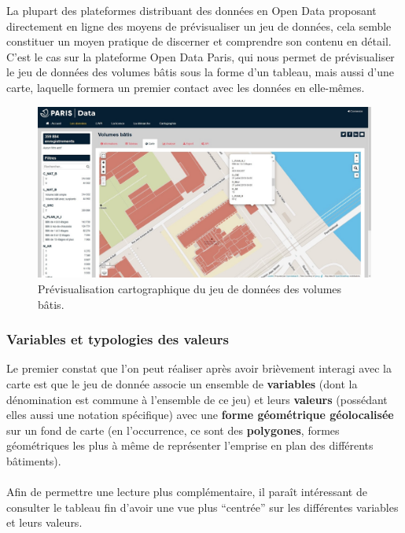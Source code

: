 \documentclass[
  11pt,
  french,
]{article}
\begin{document}
La plupart des plateformes distribuant des données en Open Data
proposant directement en ligne des moyens de prévisualiser un jeu de
données, cela semble constituer un moyen pratique de discerner et
comprendre son contenu en détail. C'est le cas sur la plateforme Open
Data Paris, qui nous permet de prévisualiser le jeu de données des
volumes bâtis sous la forme d'un tableau, mais aussi d'une carte,
laquelle formera un premier contact avec les données en elle-mêmes.\\

\begin{tcolorbox}
\begin{figure}

{\centering \includegraphics[width=0.9\linewidth]{__imgs/site_odp_carte} 

}

\caption[Prévisualisation cartographique du jeu de données des volumes bâtis.  -  https://opendata.paris.fr/]{Prévisualisation cartographique du jeu de données des volumes bâtis.}\label{fig:odp_carte}
\end{figure}
\end{tcolorbox}

\hfill\break

\hypertarget{variables-et-typologies-des-valeurs}{%
\subsubsection{Variables et typologies des
valeurs}\label{variables-et-typologies-des-valeurs}}

Le premier constat que l'on peut réaliser après avoir brièvement
interagi avec la carte est que le jeu de donnée associe un ensemble de
\textbf{variables} (dont la dénomination est commune à l'ensemble de ce
jeu) et leurs \textbf{valeurs} (possédant elles aussi une notation
spécifique) avec une \textbf{forme géométrique géolocalisée} sur un fond
de carte (en l'occurrence, ce sont des \textbf{polygones}, formes
géométriques les plus à même de représenter l'emprise en plan des
différents bâtiments).\\
~\\
Afin de permettre une lecture plus complémentaire, il paraît intéressant
de consulter le tableau fin d'avoir une vue plus ``centrée'' sur les
différentes variables et leurs valeurs.\\
\end{document}
